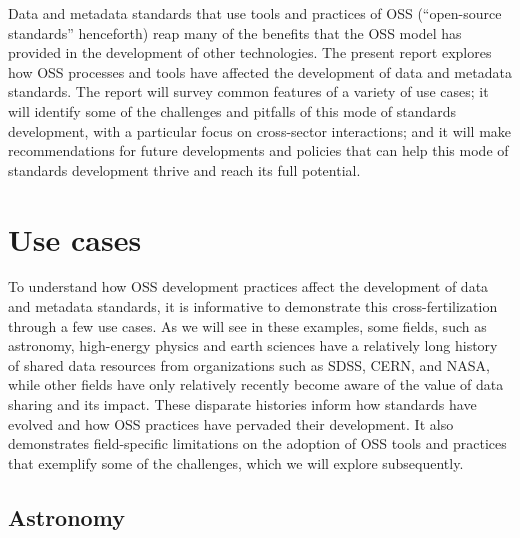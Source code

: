 \documentclass[
  number]{elsarticle}
\begin{document}
Data and metadata standards that use tools and practices of OSS
(``open-source standards'' henceforth) reap many of the benefits that
the OSS model has provided in the development of other technologies. The
present report explores how OSS processes and tools have affected the
development of data and metadata standards. The report will survey
common features of a variety of use cases; it will identify some of the
challenges and pitfalls of this mode of standards development, with a
particular focus on cross-sector interactions; and it will make
recommendations for future developments and policies that can help this
mode of standards development thrive and reach its full potential.

\section{Use cases}\label{sec-use-cases}

To understand how OSS development practices affect the development of
data and metadata standards, it is informative to demonstrate this
cross-fertilization through a few use cases. As we will see in these
examples, some fields, such as astronomy, high-energy physics and earth
sciences have a relatively long history of shared data resources from
organizations such as SDSS, CERN, and NASA, while other fields have only
relatively recently become aware of the value of data sharing and its
impact. These disparate histories inform how standards have evolved and
how OSS practices have pervaded their development. It also demonstrates
field-specific limitations on the adoption of OSS tools and practices
that exemplify some of the challenges, which we will explore
subsequently.

\subsection{Astronomy}\label{astronomy}
\end{document}
